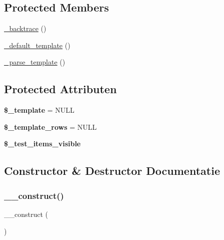 \subsection*{Protected Members}
\begin{DoxyCompactItemize}
\item 
\mbox{\hyperlink{class_c_i___unit__test_aae40ff64c7daf1d70efaf110181a257e}{\+\_\+backtrace}} ()
\item 
\mbox{\hyperlink{class_c_i___unit__test_ae1990fcb9ffc455614eeac9a1091f0b0}{\+\_\+default\+\_\+template}} ()
\item 
\mbox{\hyperlink{class_c_i___unit__test_a884e99b431f75c1ad17ba9753dab3b49}{\+\_\+parse\+\_\+template}} ()
\end{DoxyCompactItemize}
\subsection*{Protected Attributen}
\begin{DoxyCompactItemize}
\item 
\mbox{\label{class_c_i___unit__test_a353afce17912a98c6a9ead92e679570d}} 
{\bfseries \$\+\_\+template} = N\+U\+LL
\item 
\mbox{\label{class_c_i___unit__test_a5d3e2ba4262eb08f117b1e6842f1f162}} 
{\bfseries \$\+\_\+template\+\_\+rows} = N\+U\+LL
\item 
{\bfseries \$\+\_\+test\+\_\+items\+\_\+visible}
\end{DoxyCompactItemize}


\subsection{Constructor \& Destructor Documentatie}
\mbox{\label{class_c_i___unit__test_a095c5d389db211932136b53f25f39685}} 
\subsubsection{\texorpdfstring{\_\_construct()}{\_\_construct()}}
{\footnotesize\ttfamily \+\_\+\+\_\+construct (\begin{DoxyParamCaption}{ }\end{DoxyParamCaption})}

